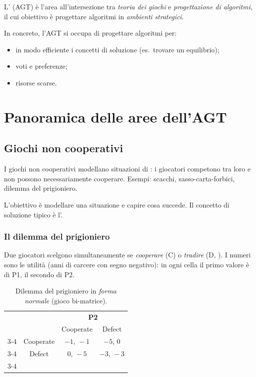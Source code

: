 \begin{definizione}
L' (AGT) è l'area all'intersezione tra \emph{teoria dei giochi}
e \emph{progettazione di algoritmi}, il cui obiettivo è progettare algoritmi in
\emph{ambienti strategici}. 
\end{definizione}

In concreto, l'AGT si occupa di progettare algoritmi per:
\begin{itemize}
  \item {} in modo efficiente i concetti di soluzione (es.\ trovare un equilibrio);
  \item {} voti e preferenze;
  \item {} risorse scarse.
\end{itemize}

\section{Panoramica delle aree dell'AGT}

\subsection{Giochi non cooperativi}

I giochi non cooperativi modellano situazioni di : i giocatori competono
tra loro e non possono necessariamente cooperare.
Esempi: scacchi, sasso-carta-forbici, dilemma del prigioniero.

L'obiettivo è modellare una situazione e capire cosa succede. Il concetto di soluzione
tipico è l'.

\subsubsection*{Il dilemma del prigioniero}

Due giocatori scelgono simultaneamente se \emph{cooperare} (C) o \emph{tradire} (D, ).
I numeri sono le utilità (anni di carcere con segno negativo): in ogni cella il primo valore è di P1,
il secondo di P2.

\begin{table}[H]
\centering
\renewcommand{\arraystretch}{1.4}
\begin{tabular}{cc|c|c|}
  & \multicolumn{1}{c}{} & \multicolumn{2}{c}{\textbf{P2}} \\
  & \multicolumn{1}{c}{} & \multicolumn{1}{c}{Cooperate} & \multicolumn{1}{c}{Defect} \\ \cline{3-4}
  \multirow{2}{*}{\textbf{P1}} & Cooperate & $-1,\,-1$ & $-5,\,0$ \\ \cline{3-4}
                               & Defect    & $0,\,-5$  & $-3,\,-3$ \\ \cline{3-4}
\end{tabular}
\caption{Dilemma del prigioniero in \emph{forma normale} (gioco bi-matrice).}
\end{table}

